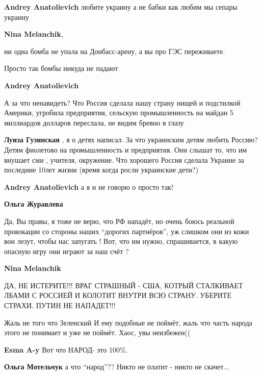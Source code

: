 \begin{itemize}
\begin{itemize}
\textbf{Andrey Anatolievich} любите украину а не бабки как любим мы сепары украину

\textbf{Nina Melanchik}, 

ни одна бомба не упала на Донбасс-арену, а вы про ГЭС переживаете.

Просто так бомбы никуда не падают

\textbf{Andrey Anatolievich} 

А за что ненавидеть? Что Россия сделала нашу страну нищей и подстилкой Америки,
угробила предприятия, сельскую промышленность на майдан 5 миллиардов долларов
переслала, не видим бревно в глазу

\textbf{Луиза Гузинская} , я о детях написал.
За что украинским детям любить Россию?
Детям фиолетово на промышленность и предприятия. Они слышат то, что им внушает сми , учителя, окружение.
Что хорошего Россия сделала Украине за последние 10лет жизни (время когда росли украинские дети?)

\textbf{Andrey Anatolievich} а я и не говорю о просто так!

\textbf{Ольга Журавлева} 

Да, Вы правы, я тоже не верю, что РФ нападёт, но очень боюсь реальной
провокации со стороны наших \enquote{дорогих партнёров}, уж слишком они из кожи
вон лезут, чтобы нас запугать ! Вот, что им нужно, спрашивается, в какую
опасную игру они играют за наш счёт ?


\textbf{Nina Melanchik} 

ДА, НЕ ИСТЕРИТЕ!!! ВРАГ СТРАШНЫЙ - США, КОТРЫЙ СТАЛКИВАЕТ ЛБАМИ С РОССИЕЙ И
КОЛОТИТ ВНУТРИ ВСЮ СТРАНУ. УБЕРИТЕ СТРАХИ. ПУТИН НЕ НАПАДЕТ!!!

\end{itemize} %


Жаль не того что Зеленский И ему подобные не поймёт, жаль что часть народа
этого не понимает и уже не поймёт. Хаос, увы неизбежен((

\begin{itemize} %
\textbf{Esma A-y} Вот что НАРОД- это 100\%.

\textbf{Ольга Мотельчук} а что \enquote{народ}?? Никто не платит - никто не скачет...


\end{itemize}
\end{itemize}
